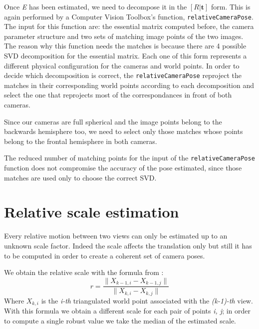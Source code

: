 Once \textit{E} has been estimated, we need to decompose it in the 
\( [R|\mathbf{t} ] \) form. This is again performed by a Computer Vision 
Toolbox's function, {\tt relativeCameraPose}.
The input for this function are: the essential matrix computed before, the 
camera parameter structure and two sets of matching image points of the two 
images.
The reason why this function needs the matches is because there are 4 possible 
SVD decomposition for the essential matrix. Each one of this form represents a 
different physical configuration for the cameras and world points.
In order to decide which decomposition is correct, the {\tt relativeCameraPose}
reproject the matches in their corresponding world points according to each 
decomposition and select the one that reprojects most of the correspondances in 
front of both cameras.

Since our cameras are full spherical and the image points belong to the 
backwards hemisphere too, we need to select only those matches whose points 
belong to the frontal hemisphere in both cameras.

The reduced number of matching points for the input of the 
{\tt relativeCameraPose} function does not compromise the accuracy of the pose 
estimated, since those matches are used only to choose the 
correct SVD.

\section{Relative scale estimation}
Every relative motion between two views can only be estimated up to an unknown 
scale factor. Indeed the scale affects the translation only but still it has to 
be computed in order to create a coherent set of camera poses.

We obtain the relative scale with the formula from 
\cite{scaramuzzaVisualOdometryI}:
\begin{equation}
r = \frac{\| X_{k-1, i} - X_{k - 1, j} \|}
	{\| X_{k, i} - X_{k, j} \|}
\end{equation}
Where \( X_{k, i} \) is the \textit{i-th} triangulated world point associated 
with the \textit{(k-1)-th} view. With this formula we obtain a different scale 
for each pair of points \textit{i, j}; in order to compute a single robust value
we take the median of the estimated scale.

